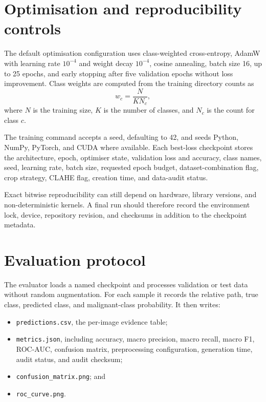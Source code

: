\section{Optimisation and reproducibility controls}
The default optimisation configuration uses class-weighted cross-entropy, AdamW with learning rate $10^{-4}$ and weight decay $10^{-4}$, cosine annealing, batch size 16, up to 25 epochs, and early stopping after five validation epochs without loss improvement. Class weights are computed from the training directory counts as
\begin{equation}
w_c=\frac{N}{K N_c},
\end{equation}
where $N$ is the training size, $K$ is the number of classes, and $N_c$ is the count for class $c$.

The training command accepts a seed, defaulting to 42, and seeds Python, NumPy, PyTorch, and CUDA where available. Each best-loss checkpoint stores the architecture, epoch, optimiser state, validation loss and accuracy, class names, seed, learning rate, batch size, requested epoch budget, dataset-combination flag, crop strategy, CLAHE flag, creation time, and data-audit status.

Exact bitwise reproducibility can still depend on hardware, library versions, and non-deterministic kernels. A final run should therefore record the environment lock, device, repository revision, and checksums in addition to the checkpoint metadata.

\section{Evaluation protocol}
The evaluator loads a named checkpoint and processes validation or test data without random augmentation. For each sample it records the relative path, true class, predicted class, and malignant-class probability. It then writes:

\begin{itemize}
    \item \texttt{predictions.csv}, the per-image evidence table;
    \item \texttt{metrics.json}, including accuracy, macro precision, macro recall, macro F1, ROC-AUC, confusion matrix, preprocessing configuration, generation time, audit status, and audit checksum;
    \item \texttt{confusion\_matrix.png}; and
    \item \texttt{roc\_curve.png}.
\end{itemize}

